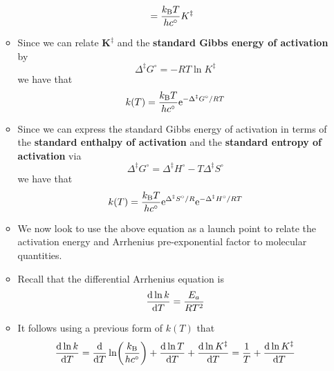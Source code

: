\documentclass[../notes.tex]{subfiles}
\begin{document}
\begin{itemize}
\begin{itemize}
\begin{align*}
            &= \frac{\kB T}{hc^\circ}K^\ddagger
        \end{align*}
        \item Since we can relate $\bm{K^\ddagger}$ and the \textbf{standard Gibbs energy of activation} by
        \begin{equation*}
            \Delta^\ddagger G^\circ = -RT\ln K^\ddagger
        \end{equation*}
        we have that
        \begin{equation*}
            k(T) = \frac{\kB T}{hc^\circ}\e[-\Delta^\ddagger G^\circ/RT]
        \end{equation*}
        \item Since we can express the standard Gibbs energy of activation in terms of the \textbf{standard enthalpy of activation} and the \textbf{standard entropy of activation} via
        \begin{equation*}
            \Delta^\ddagger G^\circ = \Delta^\ddagger H^\circ-T\Delta^\ddagger S^\circ
        \end{equation*}
        we have that
        \begin{equation*}
            k(T) = \frac{\kB T}{hc^\circ}\e[\Delta^\ddagger S^\circ/R]\e[-\Delta^\ddagger H^\circ/RT]
        \end{equation*}
        \item We now look to use the above equation as a launch point to relate the activation energy and Arrhenius pre-exponential factor to molecular quantities.
        \item Recall that the differential Arrhenius equation is
        \begin{equation*}
            \dv{\ln k}{T} = \frac{E_a}{RT^2}
        \end{equation*}
        \item It follows using a previous form of $k(T)$ that
        \begin{equation*}
            \dv{\ln k}{T} = \dv{T}\ln(\frac{\kB}{hc^\circ})+\dv{\ln T}{T}+\dv{\ln K^\ddagger}{T}
            = \frac{1}{T}+\dv{\ln K^\ddagger}{T}
        \end{equation*}

\end{itemize}
\end{itemize}
\end{document}
